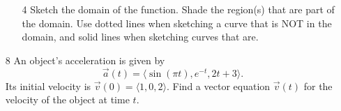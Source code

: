 \documentclass[addpoints,12pt]{exam}
\begin{document}
\begin{enumerate}
\begin{itemize}
\item[4] Sketch the domain of the function. Shade the region(s) that are part of the domain. Use
dotted lines when sketching a curve that is NOT in the domain, and solid lines when sketching
curves that are.
\vfill
\end{itemize}
\newpage
\item[8] An object's acceleration is given by
$$\vec{a}(t) = \langle \sin(\pi t), e^{-t}, 2t +3 \rangle.$$
Its initial velocity is $\vec{v}(0) = \langle 1,0,2 \rangle.$ Find a vector equation $\vec{v}(t)$ for
the velocity of the object at time $t.$
\newpage
\end{enumerate}
\end{document}
